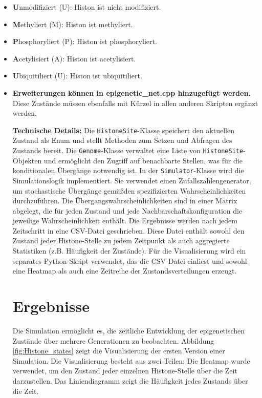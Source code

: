 \documentclass{SeminarV2}
\begin{document}
\begin{itemize}
  \item \textbf{U}nmodifiziert (U): Histon ist nicht modifiziert.
  \item \textbf{M}ethyliert (M): Histon ist methyliert.
  \item \textbf{P}hosphoryliert (P): Histon ist phosphoryliert.
  \item \textbf{A}cetylisiert (A): Histon ist acetylisiert.
  \item \textbf{U}biquitiliert (U): Histon ist ubiquitiliert.
  \item \textbf{Erweiterungen können in epigenetic_net.cpp hinzugefügt werden.} Diese Zustände müssen ebenfalls mit Kürzel in allen anderen Skripten ergänzt werden.

\textbf{Technische Details:}
Die \texttt{HistoneSite}-Klasse speichert den aktuellen Zustand als Enum und stellt Methoden zum Setzen und Abfragen des Zustands bereit.
Die \texttt{Genome}-Klasse verwaltet eine Liste von \texttt{HistoneSite}-Objekten und erm\"{o}glicht den Zugriff auf benachbarte Stellen, was f\"{u}r die konditionalen \"{U}berg\"{a}nge notwendig ist.
In der \texttt{Simulator}-Klasse wird die Simulationslogik implementiert. Sie verwendet einen Zufallszahlengenerator, um stochastische \"{U}berg\"{a}nge gem\"{a}\ss den spezifizierten Wahrscheinlichkeiten durchzuf\"{u}hren. Die \"{U}bergangswahrscheinlichkeiten sind in einer Matrix abgelegt, die f\"{u}r jeden Zustand und jede Nachbarschaftskonfiguration die jeweilige Wahrscheinlichkeit enth\"{a}lt.
Die Ergebnisse werden nach jedem Zeitschritt in eine CSV-Datei geschrieben. Diese Datei enth\"{a}lt sowohl den Zustand jeder Histone-Stelle zu jedem Zeitpunkt als auch aggregierte Statistiken (z.B. H\"{a}ufigkeit der Zust\"{a}nde).
F\"{u}r die Visualisierung wird ein separates Python-Skript verwendet, das die CSV-Datei einliest und sowohl eine Heatmap als auch eine Zeitreihe der Zustandsverteilungen erzeugt.

\section{Ergebnisse}
Die Simulation erm\"{o}glicht es, die zeitliche Entwicklung der epigenetischen Zust\"{a}nde 
\"{u}ber mehrere Generationen zu beobachten. Abbildung \ref{fig:Histone_states} zeigt die Visualisierung der ersten Version einer Simulation.
Die Visualisierung besteht aus zwei Teilen: Die Heatmap wurde verwendet, um den Zustand jeder einzelnen Histone-Stelle \"{u}ber die Zeit darzustellen.
Das Liniendiagramm zeigt die H\"{a}ufigkeit jedes Zustands \"{u}ber die Zeit.


\end{itemize}
\end{document}
